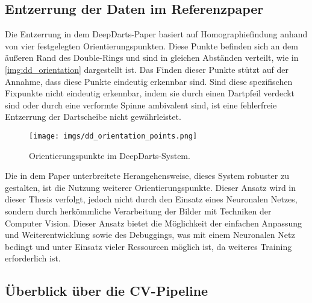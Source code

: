 
\subsection{Entzerrung der Daten im Referenzpaper}
\label{sec:impl:cv:paper}

Die Entzerrung in dem DeepDarts-Paper basiert auf Homographiefindung anhand von vier festgelegten Orientierungspunkten. Diese Punkte befinden sich an dem äußeren Rand des Double-Rings und sind in gleichen Abständen verteilt, wie in \autoref{img:dd_orientation} dargestellt ist. Das Finden dieser Punkte stützt auf der Annahme, dass diese Punkte eindeutig erkennbar sind. Sind diese spezifischen Fixpunkte nicht eindeutig erkennbar, indem sie durch einen Dartpfeil verdeckt sind oder durch eine verformte Spinne ambivalent sind, ist eine fehlerfreie Entzerrung der Dartscheibe nicht gewährleistet.

\begin{figure}
    \centering
    \texttt{[image: imgs/dd\_orientation\_points.png]}
    \caption{Orientierungspunkte im DeepDarts-System. \cite{deepdarts}}
    \label{img:dd_orientation}
\end{figure}

Die in dem Paper unterbreitete Herangehensweise, dieses System robuster zu gestalten, ist die Nutzung weiterer Orientierungspunkte. Dieser Ansatz wird in dieser Thesis verfolgt, jedoch nicht durch den Einsatz eines Neuronalen Netzes, sondern durch herkömmliche Verarbeitung der Bilder mit Techniken der Computer Vision. Dieser Ansatz bietet die Möglichkeit der einfachen Anpassung und Weiterentwicklung sowie des Debuggings, was mit einem Neuronalen Netz bedingt und unter Einsatz vieler Ressourcen möglich ist, da weiteres Training erforderlich ist.




\subsection{Überblick über die CV-Pipeline}
\label{sec:impl:cv:pipeline}


